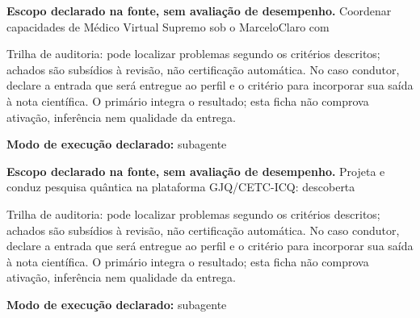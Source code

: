 
\begin{descricao}
\textbf{Escopo declarado na fonte, sem avaliação de desempenho.}
Coordenar capacidades de Médico Virtual Supremo sob o MarceloClaro com
\end{descricao}

\begin{funcao}
Trilha de auditoria: pode localizar problemas segundo os critérios descritos; achados são subsídios à revisão, não certificação automática. No caso condutor, declare a entrada que será entregue ao perfil e o critério para incorporar sua saída à nota científica. O primário integra o resultado; esta ficha não comprova ativação, inferência nem qualidade da entrega.
\end{funcao}

\begin{arquitetura}
\textbf{Modo de execução declarado:} subagente
\end{arquitetura}


\begin{descricao}
\textbf{Escopo declarado na fonte, sem avaliação de desempenho.}
Projeta e conduz pesquisa quântica na plataforma GJQ/CETC-ICQ: descoberta
\end{descricao}

\begin{funcao}
Trilha de auditoria: pode localizar problemas segundo os critérios descritos; achados são subsídios à revisão, não certificação automática. No caso condutor, declare a entrada que será entregue ao perfil e o critério para incorporar sua saída à nota científica. O primário integra o resultado; esta ficha não comprova ativação, inferência nem qualidade da entrega.
\end{funcao}

\begin{arquitetura}
\textbf{Modo de execução declarado:} subagente
\end{arquitetura}


